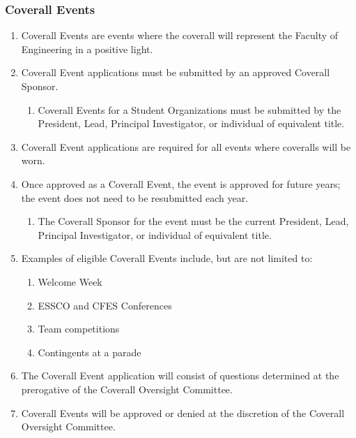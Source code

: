 \subsubsection{Coverall Events}
\label{coverall-events}
\begin{enumerate}
 \item
  Coverall Events are events where the coverall will represent the
  Faculty of Engineering in a positive light.
 \item
  Coverall Event applications must be submitted by an approved Coverall
  Sponsor.

  \begin{enumerate}
   \item
    Coverall Events for a Student Organizations must be submitted by the
    President, Lead, Principal Investigator, or individual of equivalent
    title.
  \end{enumerate}
 \item
  Coverall Event applications are required for all events where
  coveralls will be worn.
 \item
  Once approved as a Coverall Event, the event is approved for future
  years; the event does not need to be resubmitted each year.

  \begin{enumerate}
   \item
    The Coverall Sponsor for the event must be the current President,
    Lead, Principal Investigator, or individual of equivalent title.
  \end{enumerate}
 \item
  Examples of eligible Coverall Events include, but are not limited to:

  \begin{enumerate}
   \item
    Welcome Week
   \item
    ESSCO and CFES Conferences
   \item
    Team competitions
   \item
    Contingents at a parade
  \end{enumerate}
 \item
  The Coverall Event application will consist of questions determined at
  the prerogative of the Coverall Oversight Committee.
 \item
  Coverall Events will be approved or denied at the discretion of the
  Coverall Oversight Committee.

\end{enumerate}

